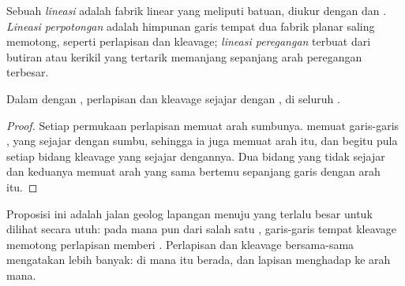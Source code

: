 \begin{definition}\label{def:b1:faults-folds-fabrics:lineation}
Sebuah \emph{lineasi} adalah fabrik linear yang meliputi batuan, diukur dengan  dan . \emph{Lineasi perpotongan} adalah himpunan garis tempat dua fabrik planar saling memotong, seperti perlapisan dan kleavage; \emph{lineasi peregangan} terbuat dari butiran atau kerikil yang tertarik memanjang sepanjang arah peregangan terbesar.
\end{definition}

\begin{proposition}\label{prop:b1:faults-folds-fabrics:intersection}
Dalam  dengan ,  perlapisan dan kleavage sejajar dengan , di seluruh .
\end{proposition}

\begin{proof}
Setiap permukaan perlapisan  memuat arah sumbunya.  memuat garis-garis , yang sejajar dengan sumbu, sehingga ia juga memuat arah itu, dan begitu pula setiap bidang kleavage yang sejajar dengannya. Dua bidang yang tidak sejajar dan keduanya memuat arah yang sama bertemu sepanjang garis dengan arah itu.
\end{proof}

Proposisi ini adalah jalan geolog lapangan menuju   yang terlalu besar untuk dilihat secara utuh: pada  mana pun dari salah satu , garis-garis tempat kleavage memotong perlapisan memberi . Perlapisan dan kleavage bersama-sama mengatakan lebih banyak: di mana  itu berada, dan lapisan menghadap ke arah mana.

